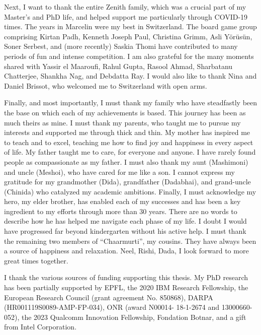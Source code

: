 Next, I want to thank the entire Zenith family, which was a crucial part of my
Master's and PhD life, and helped support me particularly through COVID-19 times.
The years in Marcelin were my best in Switzerland.
The board game group comprising Kirtan Padh, Kenneth Joseph Paul, Christina Grimm,
Asli Yörüsün, Soner Serbest, and (more recently) Saskia Thomi have contributed to 
many periods of fun and intense competition. 
I am also grateful for the many moments shared with Yassir el Maaroufi, Rahul Gupta, 
Rasool Ahmad, Sharbatanu Chatterjee, Shankha Nag, and Debdatta Ray.
I would also like to thank Nina and Daniel Brissot, who welcomed me to Switzerland
with open arms.

Finally, and most importantly, I must thank my family who have steadfastly been
the base on which each of my achievements is based.
This journey has been as much theirs as mine.
I must thank my parents, who taught me to pursue my interests and supported me through
thick and thin. 
My mother has inspired me to teach and to excel, teaching me how to find joy and 
happiness in every aspect of life. 
My father taught me to care, for everyone and anyone. 
I have rarely found people as compassionate as my father. 
I must also thank my aunt (Mashimoni) and uncle (Meshoi), 
who have cared for me like a son.
I cannot express my gratitude for my grandmother (Dida), grandfather (Dadabhai),
and grand-uncle (Chinida) who catalyzed my academic ambitions.
Finally, I must acknowledge my hero, my elder brother, has enabled each of my 
successes and has been a key ingredient to my efforts through more than 30 years.
There are no words to describe how he has helped me navigate each phase of my life. 
I doubt I would have progressed far beyond kindergarten without his active help.
I must thank the remaining two members of ``Chaarmurti'', my cousins.
They have always been a source of happiness and relaxation. 
Neel, Rishi, Dada, I look forward to more great times together. 

\newpage
I thank the various sources of funding supporting this thesis. 
My PhD research has been partially supported by 
EPFL, 
the 2020 IBM Research Fellowship, 
the European Research Council (grant agreement No. 850868),
DARPA (HR001119S0089-AMP-FP-034),  
ONR (award N00014- 18-1-2674 and 13000660-052),
the 2023 Qualcomm Innovation Fellowship,
Fondation Botnar, and 
a gift from Intel Corporation.

